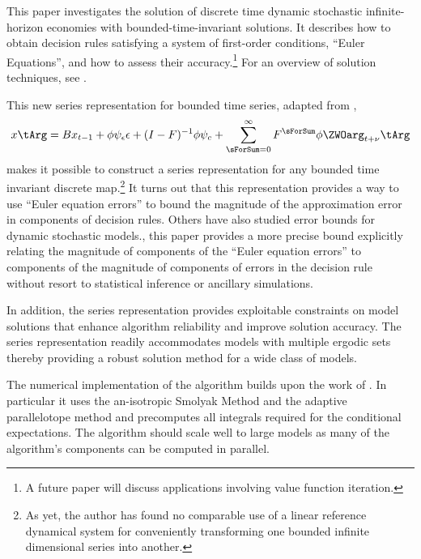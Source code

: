 \documentclass[12pt]{article}
\begin{document}
This paper investigates the solution of discrete time  dynamic stochastic
infinite-horizon economies with bounded-time-invariant solutions.
It describes how to obtain decision rules satisfying a system of 
first-order conditions, ``Euler Equations'',  and how to assess their accuracy.\footnote{A future paper will 
discuss  applications involving value function iteration.}
 For an overview of solution techniques,
see \citep{judd92,Christiano2000,doraszelskiy04,gaspar97,Judd2014,marcet.lorenzoni99,juddGSSA2011,maliarmovingbounds}.


This new series representation for bounded time series, adapted from \citep{anderson10},
\begin{gather*}
      	 x\tArg =B x_{t-1}+ \phi \psi_\epsilon\epsilon + (I - F)^{-1} \phi \psi_c + \sum_{\sForSum=0}^\infty F^\sForSum \phi \ZWOarg_{t+\nu}\tArg%
    \end{gather*}
 makes it possible to  construct a series
    representation for any bounded time invariant discrete map.\footnote{As yet, the author has found no comparable use of a
linear reference dynamical system for  conveniently transforming
one bounded infinite dimensional series into another.
}
    It turns out that this representation provides a way to use
    ``Euler equation errors'' to
    bound the magnitude of the    approximation error in components of 
    decision rules.
    Others have also studied error bounds for dynamic stochastic models.\cite{judd2017lower,santos2005accuracy,Santos2000accuracy}, this paper provides a more precise bound 
    explicitly relating the magnitude of components of the
    ``Euler equation errors'' to components of the magnitude of components of
    errors in the decision rule without resort to statistical inference or ancillary simulations.

    In addition, the series representation provides exploitable
    constraints on model solutions that enhance  
    algorithm reliability and improve solution accuracy.
    The series representation readily accommodates models with
    multiple ergodic sets
    thereby providing a robust solution method for a wide class of models.


The numerical implementation of the algorithm 
builds upon the work of
\citep{juddGSSA2011}.
In particular it uses
the an-isotropic Smolyak Method and the adaptive
parallelotope method\citep{Judd2014}
and precomputes all integrals required for the conditional expectations.
The algorithm should scale well to large models as many 
of the algorithm's components can be computed in parallel.
\end{document}
